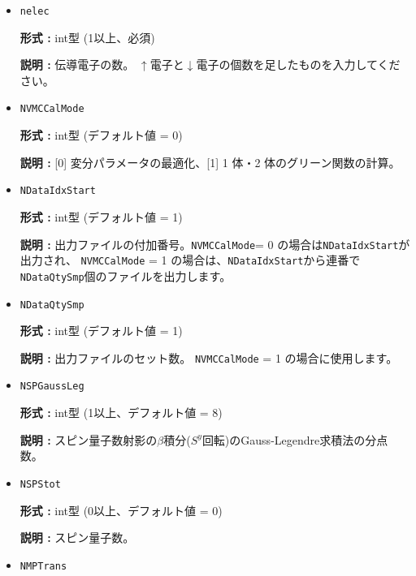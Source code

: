 \begin{itemize}

\item  \verb|nelec|

  {\bf 形式 :} {int型 (1以上、必須)}

  {\bf 説明 :} {伝導電子の数。
    $\uparrow$電子と$\downarrow$電子の個数を足したものを入力してください。}

 \item  \verb|NVMCCalMode|

 {\bf 形式 :} int型 (デフォルト値 = 0)

{\bf 説明 :} [0] 変分パラメータの最適化、[1] 1 体・2 体のグリーン関数の計算。
 


 
 \item  \verb|NDataIdxStart|

 {\bf 形式 :} int型 (デフォルト値 = 1)

{\bf 説明 :} 出力ファイルの付加番号。\verb|NVMCCalMode|= 0 の場合は\verb|NDataIdxStart|が出力され、 \verb|NVMCCalMode| = 1 の場合は、\verb|NDataIdxStart|から連番で\verb|NDataQtySmp|個のファイルを出力します。
   
 \item  \verb|NDataQtySmp|

 {\bf 形式 :} int型 (デフォルト値 = 1)

{\bf 説明 :} 出力ファイルのセット数。 \verb|NVMCCalMode| = 1 の場合に使用します。

\item  \verb|NSPGaussLeg|

  {\bf 形式 :} {int型 (1以上、{デフォルト値 = 8})}

  {\bf 説明 :} スピン量子数射影の$\beta$積分($S^y$回転)のGauss-Legendre求積法の分点数。

\item  \verb|NSPStot|

  {\bf 形式 :} int型 (0以上、{デフォルト値 = 0})

  {\bf 説明 :}  スピン量子数。

\item  \verb|NMPTrans|


\end{itemize}
